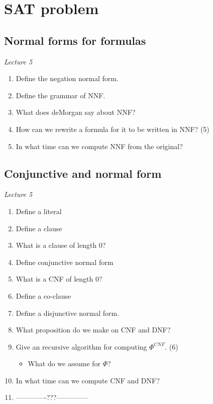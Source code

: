 \documentclass[fleqn]{article}
\begin{document}

\section{SAT problem}

\subsection{Normal forms for formulas}
\textit{Lecture 5}
\begin{enumerate}
    \item Define the negation normal form.
    \item Define the grammar of NNF.
    \item What does deMorgan say about NNF?
    \item How can we rewrite a formula for it to be written in NNF? (5) 
    \item In what time can we compute NNF from the original?
\end{enumerate}

\subsection{Conjunctive and  normal form}
\textit{Lecture 5}
\begin{enumerate}
    \item Define a literal
    \item Define a clause
    \item What is a clause of length 0?
    \item Define conjunctive normal form
    \item What is a CNF of length 0?
    \item Define a co-clause
    \item Define a disjunctive normal form.
    \item What proposition do we make on CNF and DNF?
    \item Give an recursive algorithm for computing $\Phi^{CNF}$. (6)
    \begin{itemize}
        \item What do we assume for $\Phi$?
    \end{itemize}
    \item In what time can we compute CNF and DNF?
    \item -------------???-------------- 
\end{enumerate}
\end{document}
